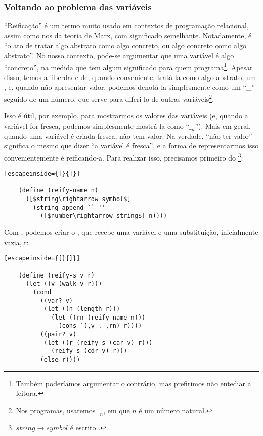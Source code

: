\documentclass{article}
\begin{document}
  \subsubsection{Voltando ao problema das variáveis}

  ``Reificação'' é um termo muito usado em contextos de programação
  relacional, assim como nos da teoria de Marx, com significado
  semelhante. Notadamente, é ``o ato de tratar algo abstrato como algo
  concreto, ou algo concreto como algo abstrato''. No nosso contexto,
  pode-se argumentar que uma variável é algo ``concreto'', na medida
  que tem algum significado para quem programa\footnote{Também
    poderíamos argumentar o contrário, mas prefirimos não entediar a
    leitora.}. Apesar disso, temos a liberdade de, quando conveniente,
  tratá-la como algo abstrato, um , e, quando
  não apresentar valor, podemos denotá-la simplesmente como um ``\_''
  seguido de um número, que serve para diferi-lo de outras
  variáveis\footnote{Nos programas, usaremos $\__n$, em que $n$ é um
    número natural.}.

  Isso é útil, por exemplo, para mostrarmos os valores das variáveis
  (e, quando a variável for fresca, podemos simplesmente mostrá-la
  como ``$\__n$''). Mais em geral, quando uma variável é criada
  fresca, não tem valor. Na verdade, ``não ter valor'' significa o
  mesmo que dizer ``a variável é fresca'', e a forma de representarmos
  isso convenientemente é reificando-a. Para realizar isso, precisamos
  primeiro do \footnote{$string\rightarrow symbol$ é escrito
    .}:

  \begin{lstlisting}[escapeinside={[}{]}]

    (define (reify-name n)
      ([$string\rightarrow symbol$]
        (string-append ``_''
          ([$number\rightarrow string$] n))))

  \end{lstlisting}

  Com , podemos criar o , que
  recebe uma variável e uma substituição, inicialmente vazia, r:

  \begin{lstlisting}[escapeinside={[}{]}]

    (define (reify-s v r)
      (let ((v (walk v r)))
        (cond
          ((var? v)
           (let ((n (length r)))
             (let ((rn (reify-name n)))
               (cons `(,v . ,rn) r))))
          ((pair? v)
           (let ((r (reify-s (car v) r)))
             (reify-s (cdr v) r)))
          (else r))))

  \end{lstlisting}
\end{document}
